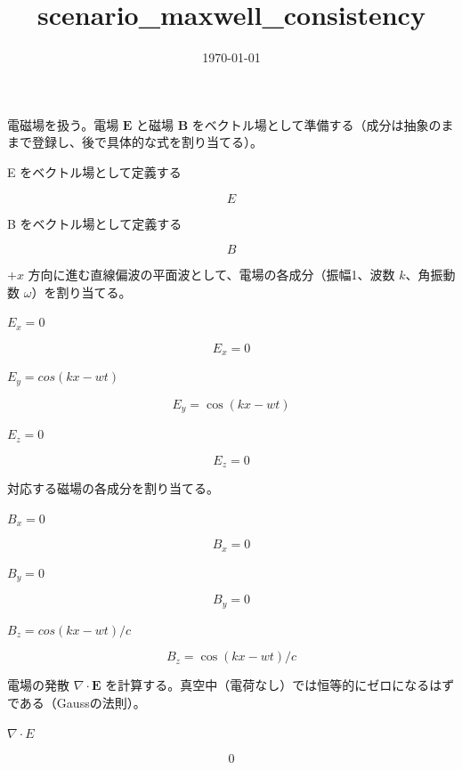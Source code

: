 \documentclass[dvipdfmx,a4paper,11pt]{jsarticle}
\title{scenario\_maxwell\_consistency}
\date{\today}
\begin{document}
\maketitle

電磁場を扱う。電場 $\mathbf E$ と磁場 $\mathbf B$ をベクトル場として準備する（成分は抽象のままで登録し、後で具体的な式を割り当てる）。

E をベクトル場として定義する

\[
  E
\]

B をベクトル場として定義する

\[
  B
\]

$+x$ 方向に進む直線偏波の平面波として、電場の各成分（振幅1、波数 $k$、角振動数 $\omega$）を割り当てる。

$E_x = 0$

\begin{equation}
  E_x = 0
  \label{eq:E1}
\end{equation}

$E_y = cos(k x - w t)$

\begin{equation}
  E_y = \cos(k x - w t)
  \label{eq:E2}
\end{equation}

$E_z = 0$

\begin{equation}
  E_z = 0
  \label{eq:E3}
\end{equation}

対応する磁場の各成分を割り当てる。

$B_x = 0$

\begin{equation}
  B_x = 0
  \label{eq:E4}
\end{equation}

$B_y = 0$

\begin{equation}
  B_y = 0
  \label{eq:E5}
\end{equation}

$B_z = cos(k x - w t)/c$

\begin{equation}
  B_z = \cos(k x - w t)/c
  \label{eq:E6}
\end{equation}

電場の発散 $\nabla\cdot\mathbf E$ を計算する。真空中（電荷なし）では恒等的にゼロになるはずである（Gaussの法則）。

$\nabla \cdot E$

\begin{equation}
  0
  \label{eq:E7}
\end{equation}
\end{document}

